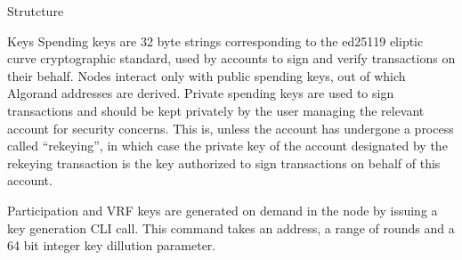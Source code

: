\documentclass[10pt,a4paper]{article}
\begin{document}
\begin{section}{Strutcture}
\begin{subsection}{Keys}
    Spending keys are 32 byte strings corresponding to the ed25119 eliptic curve cryptographic standard,
    used by accounts to sign and verify transactions
    on their behalf. Nodes interact only with public spending keys, out of which
    Algorand addresses are derived. Private spending keys are used to sign transactions
    and should be kept privately by the user managing the relevant account for security
    concerns. This is, unless the account has undergone a process called ``rekeying'', in which case 
    the private key of the account designated by the rekeying transaction is the key authorized 
    to sign transactions on behalf of this account.

    Participation and VRF keys are generated on demand in the node by issuing a key generation CLI call.
    This command takes an address, a range of rounds and a 64 bit integer key dillution parameter.


\end{subsection}
\end{section}
\end{document}
